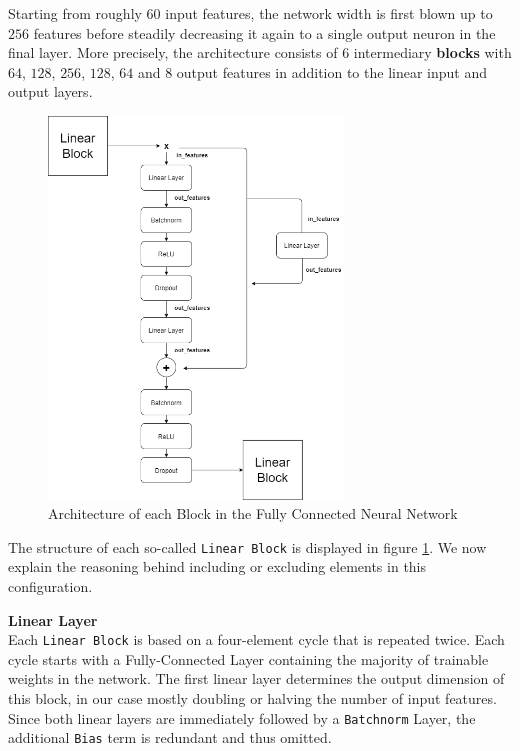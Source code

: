 \documentclass[12pt, letterpaper]{article}
\begin{document}
Starting from roughly $60$ input features, the network width is first blown up to $256$ features before steadily decreasing it again to a single output neuron in the final layer.
More precisely, the architecture consists of $6$ intermediary \textbf{blocks} with $64$, $128$, $256$, $128$, $64$ and $8$ output features in addition to the linear input and output layers.

\begin{figure}[t]
    \centering
    \includegraphics[width=0.7\textwidth]{mlp_architecture.png}
    \caption{Architecture of each Block in the Fully Connected Neural Network}
    \label{fig:linear-block}
\end{figure}

The structure of each so-called \texttt{Linear Block} is displayed in figure \ref{fig:linear-block}.
We now explain the reasoning behind including or excluding elements in this configuration.

\textbf{Linear Layer} \\
Each \texttt{Linear Block} is based on a four-element cycle that is repeated twice.
Each cycle starts with a Fully-Connected Layer containing the majority of trainable weights in the network.
The first linear layer determines the output dimension of this block, in our case mostly doubling or halving the number of input features.
Since both linear layers are immediately followed by a \texttt{Batchnorm} Layer, the additional \texttt{Bias} term is redundant and thus omitted.
\end{document}

